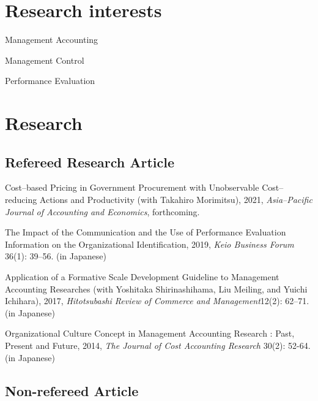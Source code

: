 \documentclass[letterpaper,uplatex]{article}
\renewenvironment{itemize}{
  \begin{list}{}{
    \setlength{\leftmargin}{1.5em}
  }
}{
  \end{list}
}
\begin{document}
\section*{Research interests}

\begin{itemize}
  \item Management Accounting
  \item Management Control
  \item Performance Evaluation
\end{itemize}

\section*{Research}

\subsection*{Refereed Research Article}

\begin{itemize}
    \item Cost--based Pricing in Government Procurement with Unobservable Cost--reducing Actions and Productivity (with Takahiro Morimitsu), 2021, \textit{Asia--Pacific Journal of Accounting and Economics}, forthcoming.
    
    \item The Impact of the Communication and the Use of Performance Evaluation Information on the Organizational Identification, 2019, \textit{Keio Business Forum} 36(1): 39--56. (in Japanese)

	\item Application of a Formative Scale Development Guideline to Management Accounting Researches (with Yoshitaka Shirinashihama, Liu Meiling, and Yuichi Ichihara), 2017, \textit{Hitotsubashi Review of Commerce and Management}12(2): 62--71. (in Japanese)

	\item Organizational Culture Concept in Management Accounting Research : Past, Present and Future, 2014, \textit{The Journal of Cost Accounting Research} 30(2): 52-64. (in Japanese)
\end{itemize}

\subsection*{Non-refereed Article}
\end{document}
